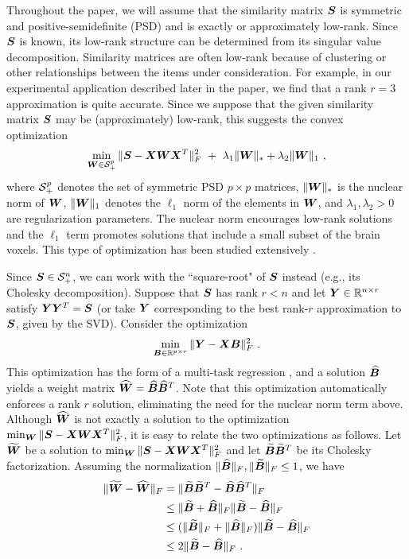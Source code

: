 Throughout the paper, we will assume that the similarity matrix $\boldsymbol{S}$ is symmetric and positive-semidefinite (PSD) and is exactly or approximately low-rank.  Since $\boldsymbol{S}$ is known, its low-rank structure can be determined from its singular value decomposition. Similarity matrices are often low-rank because of clustering or other relationships between the items under consideration. For example, in our experimental application described later in the paper, we find that a rank $r=3$ approximation is quite accurate.  Since we suppose that the given similarity matrix $\boldsymbol{S}$ may be (approximately) low-rank, this suggests the convex optimization
$$\min_{\bW\in \S_+^p} \|\bS-\bX\bW\bX^T\|_F^2 \ + \ \lambda_1 \|\bW\|_\ast + \lambda_2 \|\bW\|_1 \ , $$
where $\S_+^p$ denotes the set of symmetric PSD $p\times p$ matrices, $ \|\boldsymbol{W}\|_\ast$ is the nuclear norm of $\boldsymbol{W}$, $\|\boldsymbol{W}\|_1 $ denotes the $\ell_1$ norm of the elements in $\boldsymbol{W}$, and $\lambda_1,\lambda_2>0$ are regularization parameters.  The nuclear norm encourages low-rank solutions and the $\ell_1$ term promotes solutions that include a small subset of the brain voxels. 
This type of optimization has been studied extensively \cite{maryam}.

Since $\bS \in \S_+^n$, we can work with the ``square-root" of $\boldsymbol{S}$ instead (e.g., its Cholesky decomposition).  Suppose that $\boldsymbol{S}$ has rank $r<n$ and let $\boldsymbol{Y}\in {\mathbb R}^{n\times r}$ satisfy $\boldsymbol{Y}\boldsymbol{Y}^T = \boldsymbol{S}$ (or take $\boldsymbol{Y}$ corresponding to the best rank-$r$ approximation to $\boldsymbol{S}$, given by the SVD). Consider the optimization
\begin{eqnarray}
\min_{\boldsymbol{B}\in {\mathbb R}^{p\times r}} \|\boldsymbol{Y}-\boldsymbol{X}\boldsymbol{B}\|_F^2 \ .
\end{eqnarray}
This  optimization has the form of a multi-task regression \cite{obo11,lounici,vandegeer}, and a solution $\widehat {\boldsymbol{B}}$ yields a weight matrix $\widehat {\boldsymbol{W}} =  \widehat {\boldsymbol{B}} \widehat{\boldsymbol{B}}^{T}$.  Note that this optimization automatically enforces a rank $r$ solution, eliminating the need for the nuclear norm term above.
Although $\widehat {\boldsymbol{W}}$ is not exactly a solution to the optimization $\min_{\boldsymbol{W}} \|\boldsymbol{S}-\boldsymbol{X}\boldsymbol{W}\boldsymbol{X}^T\|_F^2$, it is easy to relate the two optimizations as follows.  Let $\widetilde {\boldsymbol{W}}$ be a solution to $\min_{\boldsymbol{W}} \|\boldsymbol{S}-\boldsymbol{X}\boldsymbol{W}\boldsymbol{X}^T\|_F^2$ and let $\widetilde {\boldsymbol{B}}\widetilde{\boldsymbol{B}}^T$ be its Cholesky factorization.
Assuming the normalization  $\|\widehat{\boldsymbol{B}}\|_F, \|\widetilde {\boldsymbol{B}}\|_F \leq 1$, we have
\begin{align*}
\|\widetilde {\boldsymbol{W}} - \widehat{\boldsymbol{W}} \|_F &= \|\widetilde {\boldsymbol{B}} \widetilde{\boldsymbol{B}}^{T} - \widehat{\boldsymbol{B}} \widehat{\boldsymbol{B}}^T\|_F\\
&\leq \|\widetilde {\boldsymbol{B}} + \widehat{\boldsymbol{B}} \|_F \|\widetilde {\boldsymbol{B}} - \widehat{\boldsymbol{B}}\|_F\\
&\leq (\|\widetilde{\boldsymbol{B}}\|_F + \|\widehat{\boldsymbol{B}}\|_F) \|\widetilde{\boldsymbol{B}} - \widehat{\boldsymbol{B}}\|_F\\
&\leq 2\|\widetilde{\boldsymbol{B}} - \widehat{\boldsymbol{B}}\|_F \ .
\end{align*}


